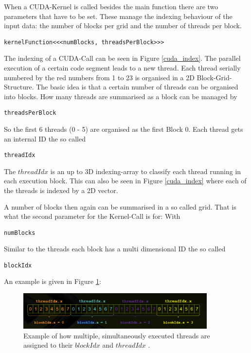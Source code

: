 When a CUDA-Kernel is called besides the main function there are two parameters that have to be set. These manage the indexing behaviour of the input data: the number of blocks per grid and the number of threads per block.
\begin{verbatim}
kernelFunction<<<numBlocks, threadsPerBlock>>>
\end{verbatim}
The indexing of a CUDA-Call can be seen in Figure \ref{cuda_index}. 
The parallel execution of a certain code segment leads to a new thread. Each thread serially numbered by the red numbers from 1 to 23 is organised in a 2D Block-Grid-Structure. The basic idea is that a certain number of threads can be organised into blocks. How many threads are summarised as a block can be managed by \begin{verbatim}
threadsPerBlock
\end{verbatim}
So the first 6 threads (0 - 5) are organised as the first Block 0. Each thread gets an internal ID the so called  \begin{verbatim}
threadIdx
\end{verbatim}

The $threadIdx$ is an up to 3D indexing-array to classify each thread running in each execution block. This can also be seen in Figure \ref{cuda_index} where each of the threads is indexed by a 2D vector.

A number of blocks then again can be summarised in a so called grid. That is what the second parameter for the Kernel-Call is for:
With \begin{verbatim}
numBlocks
\end{verbatim}

Similar to the threads each block has a multi dimensional ID the so called 
\begin{verbatim}
blockIdx
\end{verbatim}

An example is given in Figure \ref{blockidx_threadidx}:

\begin{figure}[H]
    \centering
    \includegraphics[width=0.89\textwidth]{Graphics/blockidxthreadix_explain.png}
    \caption{Example of how multiple, simultaneously executed threads are assigned to their $blockIdx$ and $threadIdx$  \cite{cuda_indexing}.}
    \label{blockidx_threadidx}
\end{figure}

